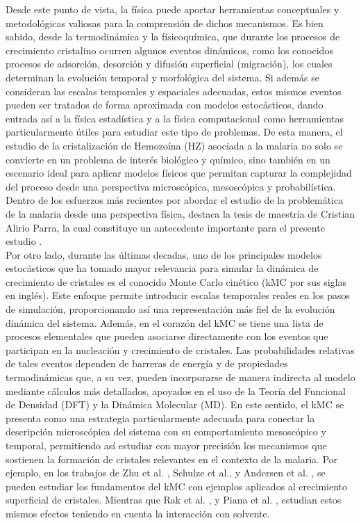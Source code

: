 \documentclass[12pt,letterpaper,oneside]{report}
\begin{document}
Desde este punto de vista, la física puede aportar herramientas conceptuales y metodológicas valiosas para la comprensión de dichos mecanismos. Es bien sabido, desde la termodinámica y la físicoquímica, que durante los procesos de crecimiento cristalino ocurren algunos eventos dinámicos, como los conocidos procesos de adsorción, desorción y difusión superficial (migración), los cuales determinan la evolución temporal y morfológica del sistema. Si además se consideran las escalas temporales y espaciales adecuadas, estos mismos eventos pueden ser tratados de forma aproximada con modelos estocásticos, dando entrada así a la física estadística y a la física computacional como herramientas particularmente útiles para estudiar este tipo de problemas. De esta manera, el estudio de la cristalización de Hemozoína (HZ) asociada a la malaria no solo se convierte en un problema de interés biológico y químico, sino también en un escenario ideal para aplicar modelos físicos que permitan capturar la complejidad del proceso desde una perspectiva microscópica, mesoscópica y probabilística. Dentro de los esfuerzos más recientes por abordar el estudio de la problemática de la malaria desde una perspectiva física, destaca la tesis de maestría de Cristian Alirio Parra, la cual constituye un antecedente importante para el presente estudio \cite{AlirioParra2023}. \\

Por otro lado, durante las últimas decadas, uno de los principales modelos estocásticos que ha tomado mayor relevancia para simular la dinámica de crecimiento de cristales es el conocido Monte Carlo  cinético (kMC por sus siglas en inglés). Este enfoque permite introducir escalas temporales reales en los pasos de simulación, proporcionando así una representación más fiel de la evolución dinámica del sistema. Además, en el corazón del kMC se tiene una lista de procesos elementales que pueden asociarse directamente con los eventos que participan en la nucleación y crecimiento de cristales. Las probabilidades relativas de tales eventos dependen de barreras de energía y de propiedades termodinámicas que, a su vez, pueden incorporarse de manera indirecta al modelo mediante cálculos más detallados, apoyados en el uso de la Teoría del Funcional de Densidad (DFT) y la Dinámica Molecular (MD). En este sentido, el kMC se presenta como una estrategia particularmente adecuada para conectar la descripción microscópica del sistema con su comportamiento mesoscópico y temporal, permitiendo así estudiar con mayor precisión los mecanismos que sostienen la formación de cristales relevantes en el contexto de la malaria. Por ejemplo, en los trabajos de Zhu et al. \cite{Zhu1992},
Schulze et al., \cite{Schulze2008} y Andersen et al. \cite{Andersen2019}, se pueden estudiar los fundamentos del kMC con ejemplos aplicados al crecimiento superficial de cristales. Mientras que Rak et al. \cite{Rak2001}, y Piana et al. \cite{Piana2006}, estudian estos mismos efectos teniendo en cuenta la interacción con solvente.  \\
\end{document}
